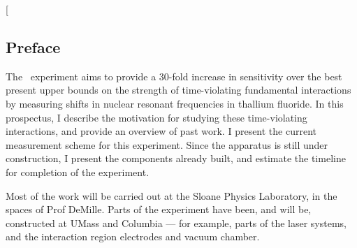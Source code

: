 \twocolumn[  
\begin{@twocolumnfalse}
    \begin{center}
        \noindent
        \begin{minipage}{1.25\columnwidth}
        \setlength{\parindent}{15pt}
        \mbox{}\vfill
        \section*{Preface}

The \CENTREX\ experiment aims to provide a 30-fold increase in sensitivity over the best present upper bounds on the strength of time-violating fundamental interactions by measuring shifts in nuclear resonant frequencies in thallium fluoride. In this prospectus, I describe the motivation for studying these time-violating interactions, and provide an overview of past work. I present the current measurement scheme for this experiment. Since the apparatus is still under construction, I present the components already built, and estimate the timeline for completion of the experiment.

Most of the work will be carried out at the Sloane Physics Laboratory, in the spaces of Prof DeMille. Parts of the experiment have been, and will be, constructed at UMass and Columbia --- for example, parts of the laser systems, and the interaction region electrodes and vacuum chamber.


\end{minipage}
\end{center}
\end{@twocolumnfalse}
